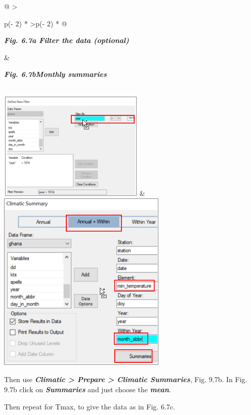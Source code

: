\documentclass[
  letterpaper,
  DIV=11,
  numbers=noendperiod]{scrreprt}
\begin{document}
\begin{longtable}[]{@{}
  >{\raggedright\arraybackslash}p{(\columnwidth - 2\tabcolsep) * }
  >{\raggedleft\arraybackslash}p{(\columnwidth - 2\tabcolsep) * }@{}}
\toprule\noalign{}
\begin{minipage}[b]{\linewidth}\raggedright
\textbf{\emph{Fig. 6.7a Filter the data (optional)}}
\end{minipage} & \begin{minipage}[b]{\linewidth}\raggedleft
\textbf{\emph{Fig. 6.7bMonthly summaries}}
\end{minipage} \\
\midrule\noalign{}
\endhead
\bottomrule\noalign{}
\endlastfoot
\includegraphics[width=2.74164in,height=2.04112in]{figures/Fig6.7a.png}
&
\includegraphics[width=3.17611in,height=3.44477in]{figures/Fig6.7b.png} \\
\end{longtable}

Then use \textbf{\emph{Climatic \textgreater{} Prepare \textgreater{}
Climatic Summaries}}, Fig. 9.7b. In Fig. 9.7b click on
\textbf{\emph{Summaries}} and just choose the \textbf{\emph{mean}}.

Then repeat for Tmax, to give the data as in Fig. 6.7c.
\end{document}
